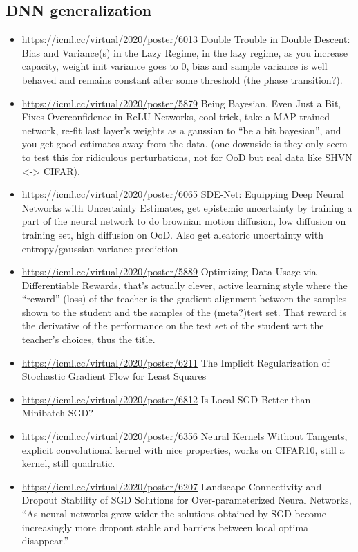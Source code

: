 \subsection{DNN generalization}
\begin{itemize}
\item \url{https://icml.cc/virtual/2020/poster/6013} Double Trouble in Double Descent: Bias and Variance(s) in the Lazy Regime, in the lazy regime, as you increase capacity, weight init variance goes to 0, bias and sample variance is well behaved and remains constant after some threshold (the phase transition?).
\item \url{https://icml.cc/virtual/2020/poster/5879}  Being Bayesian, Even Just a Bit, Fixes Overconfidence in ReLU Networks, cool trick, take a MAP trained network, re-fit last layer’s weights as a gaussian to “be a bit bayesian”, and you get good estimates away from the data. (one downside is they only seem to test this for ridiculous perturbations, not for OoD but real data like SHVN <-> CIFAR).
\item \url{https://icml.cc/virtual/2020/poster/6065}  SDE-Net: Equipping Deep Neural Networks with Uncertainty Estimates, get epistemic uncertainty by training a part of the neural network to do brownian motion diffusion, low diffusion on training set, high diffusion on OoD. Also get aleatoric uncertainty with entropy/gaussian variance prediction
\item \url{https://icml.cc/virtual/2020/poster/5889}  Optimizing Data Usage via Differentiable Rewards, that’s actually clever, active learning style where the “reward” (loss) of the teacher is the gradient alignment between the samples shown to the student and the samples of the (meta?)test set. That reward is the derivative of the performance on the test set of the student wrt the teacher’s choices, thus the title.
\item \url{https://icml.cc/virtual/2020/poster/6211}  The Implicit Regularization of Stochastic Gradient Flow for Least Squares
\item \url{https://icml.cc/virtual/2020/poster/6812}  Is Local SGD Better than Minibatch SGD?
\item \url{https://icml.cc/virtual/2020/poster/6356}  Neural Kernels Without Tangents, explicit convolutional kernel with nice properties, works on CIFAR10, still a kernel, still quadratic.
\item \url{https://icml.cc/virtual/2020/poster/6207}  Landscape Connectivity and Dropout Stability of SGD Solutions for Over-parameterized Neural Networks, “As neural networks grow wider the solutions obtained by SGD become increasingly more dropout stable and barriers between local optima disappear.”

\end{itemize}
